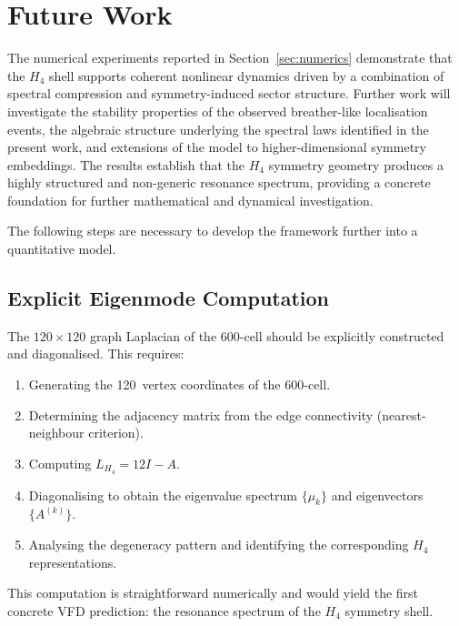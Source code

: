 \documentclass[12pt,a4paper]{article}
\newcommand{\Hfour}{H_4}
\newcommand{\Lmat}{L_{H_4}}
\begin{document}
\section{Future Work}\label{sec:future}

The numerical experiments reported in Section~\ref{sec:numerics}
demonstrate that the $\Hfour$ shell supports coherent nonlinear dynamics
driven by a combination of spectral compression and symmetry-induced
sector structure.  Further work will investigate the stability properties
of the observed breather-like localisation events, the algebraic
structure underlying the spectral laws identified in the present work,
and extensions of the model to higher-dimensional symmetry embeddings.
The results establish that the $\Hfour$ symmetry geometry produces a
highly structured and non-generic resonance spectrum, providing a
concrete foundation for further mathematical and dynamical investigation.

The following steps are necessary to develop the framework further into a
quantitative model.

\subsection{Explicit Eigenmode Computation}

The $120 \times 120$ graph Laplacian of the 600-cell should be explicitly
constructed and diagonalised.  This requires:
\begin{enumerate}[nosep]
  \item Generating the 120~vertex coordinates of the 600-cell.
  \item Determining the adjacency matrix from the edge connectivity
    (nearest-neighbour criterion).
  \item Computing $\Lmat = 12I - A$.
  \item Diagonalising to obtain the eigenvalue spectrum $\{\mu_k\}$ and
    eigenvectors $\{A^{(k)}\}$.
  \item Analysing the degeneracy pattern and identifying the corresponding
    $\Hfour$ representations.
\end{enumerate}
This computation is straightforward numerically and would yield the first
concrete VFD prediction: the resonance spectrum of the $\Hfour$ symmetry
shell.

\end{document}
